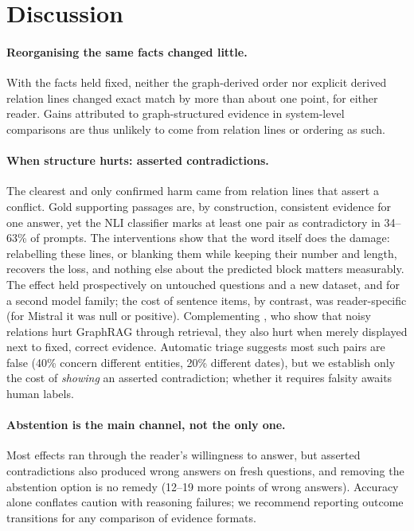\section{Discussion}
\label{sec:analysis}

\paragraph{Reorganising the same facts changed little.}
With the facts held fixed, neither the graph-derived order nor explicit derived relation lines changed exact match by more than about one point, for either reader. Gains attributed to graph-structured evidence in system-level comparisons are thus unlikely to come from relation lines or ordering as such.

\paragraph{When structure hurts: asserted contradictions.}
The clearest and only confirmed harm came from relation lines that assert a conflict. Gold supporting passages are, by construction, consistent evidence for one answer, yet the NLI classifier marks at least one pair as contradictory in 34--63\% of prompts. The interventions show that the word itself does the damage: relabelling these lines, or blanking them while keeping their number and length, recovers the loss, and nothing else about the predicted block matters measurably. The effect held prospectively on untouched questions and a new dataset, and for a second model family; the cost of sentence items, by contrast, was reader-specific (for Mistral it was null or positive). Complementing \citet{nishida-etal-2026-dissecting}, who show that noisy relations hurt GraphRAG through retrieval, they also hurt when merely displayed next to fixed, correct evidence. Automatic triage suggests most such pairs are false (40\% concern different entities, 20\% different dates), but we establish only the cost of \emph{showing} an asserted contradiction; whether it requires falsity awaits human labels.

\paragraph{Abstention is the main channel, not the only one.}
Most effects ran through the reader's willingness to answer, but asserted contradictions also produced wrong answers on fresh questions, and removing the abstention option is no remedy (12--19 more points of wrong answers). Accuracy alone conflates caution with reasoning failures; we recommend reporting outcome transitions for any comparison of evidence formats.
